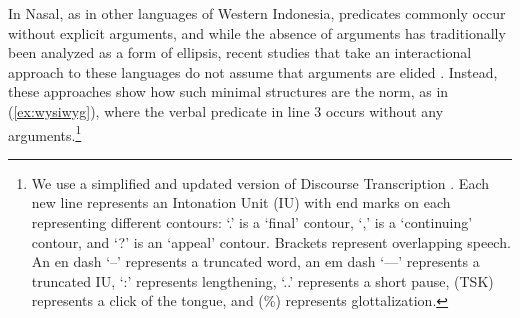 \documentclass[output=paper,colorlinks,citecolor=brown
\ChapterDOI{10.5281/zenodo.15697585}
]{langscibook}
\begin{document}

In Nasal, as in other languages of Western Indonesia, predicates commonly occur without explicit arguments, and while the absence of arguments has traditionally been analyzed as a form of ellipsis, recent studies that take an interactional approach to these languages do not assume that arguments are elided \citep[e.g.][]{ewing2019predicate}. Instead, these approaches show how such minimal structures are the norm, as in (\ref{ex:wysiwyg}), where the verbal predicate in line 3 occurs without any arguments.\footnote{We use a simplified and updated version of Discourse Transcription \citep{dubois1993}. Each new line represents an Intonation Unit (IU) with end marks on each representing different contours: `.' is a `final' contour, `,' is a `continuing' contour, and `?' is an `appeal' contour. Brackets represent overlapping speech. An en dash `--' represents a truncated word, an em dash `---' represents a truncated IU, `:' represents lengthening, `..' represents a short pause, (TSK) represents a click of the tongue, and (\%) represents glottalization.}
\end{document}
